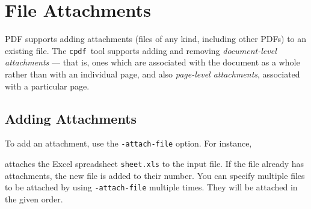 \documentclass{book}
\newcommand{\cpdf}{\texttt{cpdf}}
\begin{document}
\noindent{}


\pagestyle{empty}\thispagestyle{fancy}



\chapter{File Attachments}\pagestyle{fancy}

\noindent{}


  PDF supports adding attachments (files of any kind, including other PDFs) to
an existing file. The \cpdf\ tool supports adding and removing \textit{document-level
attachments} --- that is, ones which are associated with the document as a
whole rather than with an individual page, and also \textit{page-level attachments}, associated with a particular page.
  \section{Adding Attachments}
  To add an attachment, use the \texttt{-attach-file} option. For instance,

\noindent{}
  \noindent attaches the Excel spreadsheet \texttt{sheet.xls} to the input file. If the file already has attachments, the new file is added to their number. You can specify multiple files to be attached by using \verb!-attach-file! multiple times. They will be attached in the given order.
  
\end{document}
